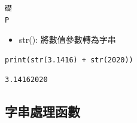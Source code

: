 \documentclass[a4paper,12pt]{article}
\begin{document}
\begin{verbatim}
礎
P
\end{verbatim}


\begin{itemize}
\item str(): 將數值參數轉為字串\\
\end{itemize}
\lstset{breaklines=true,language=Python,label= ,caption= ,captionpos=b,firstnumber=1,numbers=left}
\begin{lstlisting}
print(str(3.1416) + str(2020))
\end{lstlisting}

\begin{verbatim}
3.14162020
\end{verbatim}

\subsection{字串處理函數}
\label{sec:org856157a}
\end{document}

